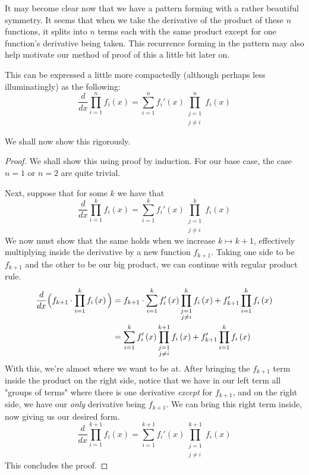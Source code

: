 It may become clear now that we have a pattern forming with a rather beautiful symmetry. It seems that when we take the derivative of the product of these \( n \) functions, it splits into \( n \) terms each with the same product except for one function's derivative being taken. This recurrence forming in the pattern may also help motivate our method of proof of this a little bit later on.

This can be expressed a little more compactedly (although perhaps less illuminatingly) as the following:
\[
    \frac{d}{dx} \prod_{i = 1}^{n} f_i \left( x \right) = \sum_{i = 1}^{n} f_i' \left( x \right) \prod_{\substack{j = 1 \\ j \ne i}}^{n} f_i \left( x \right)
\]

We shall now show this rigorously.

\begin{proof}
    We shall show this using proof by induction. For our base case, the case \( n = 1 \) or \( n = 2 \) are quite trivial.

    Next, suppose that for some \( k \) we have that
    \[
        \frac{d}{dx} \prod_{i = 1}^{k} f_i \left( x \right) = \sum_{i = 1}^{k} f_i' \left( x \right) \prod_{\substack{j = 1 \\ j \ne i}}^{k} f_i \left( x \right)
    \]
    We now must show that the same holds when we increase \( k \mapsto k + 1 \), effectively multiplying inside the derivative by a new function \( f_{k+1} \). Taking one side to be \( f_{k+1} \) and the other to be our big product, we can continue with regular product rule.
    \begin{align*}
        \frac{d}{dx} \Bigl( f_{k+1} \cdot \prod_{i = 1}^{k} f_i \left( x \right) \Bigl) &= f_{k+1} \cdot \sum_{i = 1}^{k} f_i' \left( x \right) \prod_{\substack{j = 1 \\ j \ne i}}^{k} f_i \left( x \right) + f_{k+1}' \prod_{i = 1}^{k} f_i \left( x \right) \\
        &= \sum_{i = 1}^{k} f_i' \left( x \right) \prod_{\substack{j = 1 \\ j \ne i}}^{k + 1} f_i \left( x \right) + f_{k+1}' \prod_{i = 1}^{k} f_i \left( x \right)
    \end{align*}
    With this,  we're almost where we want to be at. After bringing the \( f_{k+1} \) term inside the product on the right side, notice that we have in our left term all "groups of terms" where there is one derivative \textit{except} for \( f_{k+1} \), and on the right side, we have our \textit{only} derivative being \( f_{k+1} \). We can bring this right term inside, now giving us our desired form.
    \[
        \frac{d}{dx} \prod_{i = 1}^{k + 1} f_i \left( x \right) = \sum_{i = 1}^{k + 1} f_i' \left( x \right) \prod_{\substack{j = 1 \\ j \ne i}}^{k + 1} f_i \left( x \right)
    \]
    This concludes the proof.
\end{proof}

